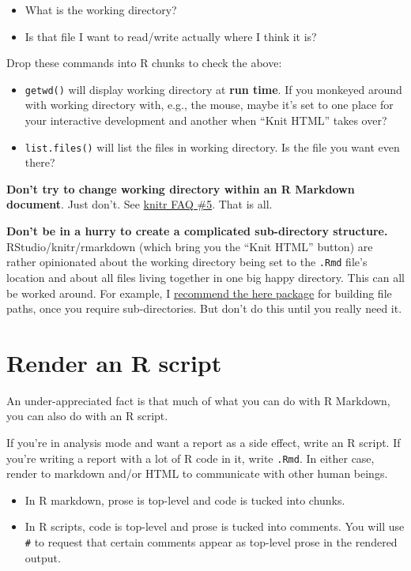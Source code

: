 \documentclass[
]{book}
\providecommand{\tightlist}{%
  \setlength{\itemsep}{0pt}\setlength{\parskip}{0pt}}
\begin{document}
\begin{itemize}
\tightlist
\item
  What is the working directory?
\item
  Is that file I want to read/write actually where I think it is?
\end{itemize}

Drop these commands into R chunks to check the above:

\begin{itemize}
\tightlist
\item
  \texttt{getwd()} will display working directory at \textbf{run time}.
  If you monkeyed around with working directory with, e.g., the mouse, maybe
  it's set to one place for your interactive development and another when
  ``Knit HTML'' takes over?
\item
  \texttt{list.files()} will list the files in working directory.
  Is the file you want even there?
\end{itemize}

\textbf{Don't try to change working directory within an R Markdown document}.
Just don't.
See \href{https://yihui.name/knitr/faq/}{knitr FAQ \#5}.
That is all.

\textbf{Don't be in a hurry to create a complicated sub-directory structure.}
RStudio/knitr/rmarkdown (which bring you the ``Knit HTML'' button) are rather opinionated about the working directory being set to the \texttt{.Rmd} file's location and about all files living together in one big happy directory.
This can all be worked around.
For example, I \href{https://github.com/jennybc/here_here\#readme}{recommend the here package} for building file paths, once you require sub-directories.
But don't do this until you really need it.

\chapter{Render an R script}\label{r-test-drive}

An under-appreciated fact is that much of what you can do with R Markdown, you can also do with an R script.

If you're in analysis mode and want a report as a side effect, write an R script.
If you're writing a report with a lot of R code in it, write \texttt{.Rmd}.
In either case, render to markdown and/or HTML to communicate with other human beings.

\begin{itemize}
\tightlist
\item
  In R markdown, prose is top-level and code is tucked into chunks.
\item
  In R scripts, code is top-level and prose is tucked into comments.
  You will use \texttt{\#\textquotesingle{}} to request that certain comments appear as top-level prose
  in the rendered output.
\end{itemize}
\end{document}
